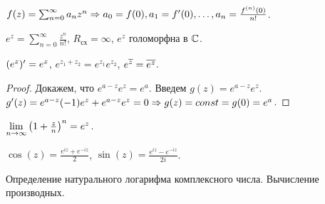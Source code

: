 \begin{note}
	$f(z) = \sum_{n = 0}^\infty a_n z^n \Rightarrow a_0 = f(0), a_1 = f'(0), \ldots, a_n = \frac{f^{(n)}(0)}{n!}$.
\end{note}

\begin{definition}
	$e^z = \sum_{n = 0}^\infty \frac{z^n}{n!}$, $R_\text{сх} = \infty$, $e^z$ голоморфна в $\mathbb{C}$.
\end{definition}

\begin{note}
	$\mathopen{}\left( e^z \right)\mathclose{}' = e^z$, $e^{z_1 + z_2} = e^{z_1} e^{z_2}$, $e^{\overline z} = \overline{e^z}$.
\end{note}
\begin{proof}
	Докажем, что $e^{a - z} e^{z} = e^a$. Введем $g(z) = e^{a - z} e^z$. $g'(z) = e^{a - z} (-1) e^z + e^{a - z} e^z = 0 \Rightarrow g(z) = const = g(0) = e^a$.
\end{proof}

\begin{note}
	$\lim\limits_{n \to \infty} {\mathopen{}\left( 1 + \frac{z}{n} \right)\mathclose{}}^n = e^z$.
\end{note}

\begin{definition}
	$\cos(z) = \frac{e^{iz} + e^{-iz}}{2}$, $\sin(z) = \frac{e^{iz} - e^{-iz}}{2i}$.
\end{definition}

{\color{red} Определение натурального логарифма комплексного числа. Вычисление производных.}